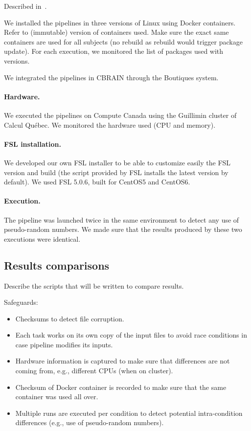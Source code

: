 \documentclass{article}
\begin{document}
Described in~\cite{glasser2013minimal}.

We installed the pipelines in three versions of Linux using Docker
containers. Refer to (immutable) version of containers used. Make sure
the exact same containers are used for all subjects (no rebuild as
rebuild would trigger package update). For each execution, we
monitored the list of packages used with versions.

We integrated the pipelines in CBRAIN through the Boutiques system.

\paragraph{Hardware.} We executed the pipelines on Compute Canada
using the Guillimin cluster of Calcul Qu\'ebec. We monitored the
hardware used (CPU and memory). 

\paragraph{FSL installation.} We developed our own FSL installer to be
able to customize easily the FSL version and build (the script
provided by FSL installs the latest version by default). We used FSL
5.0.6, built for CentOS5 and CentOS6.

\paragraph{Execution.} The pipeline was launched twice in the same
environment to detect any use of pseudo-random numbers. We
made sure that the results produced by these two executions were
identical.

\subsection{Results comparisons}

Describe the scripts that will be written to compare results.


Safeguards:
\begin{itemize}
\item Checksums to detect file corruption.
\item Each task works on its own copy of the input files to avoid race conditions in case pipeline modifies its inputs.
\item Hardware information is captured to make sure that differences are not coming from, e.g., different CPUs (when on cluster).
\item Checksum of Docker container is recorded to make sure that the same container was used all over.
\item Multiple runs are executed per condition to detect potential intra-condition differences (e.g., use of pseudo-random numbers).
\end{itemize}
\end{document}
